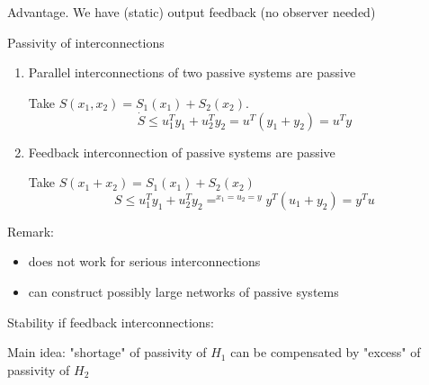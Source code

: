 Advantage. We have (static) output feedback (no observer needed)

Passivity of interconnections
\begin{enumerate}
\item Parallel interconnections of two passive systems are passive 

Take $S(x_1,x_2) = S_1(x_1) +S_2(x_2)$.
\begin{equation*}
\dot{S} \leq u_1^Ty_1 + u_2^Ty_2 = u^T(y_1+y_2) = u^Ty
\end{equation*}
\item Feedback interconnection of passive systems are passive


Take $S(x_1+x_2) = S_1(x_1) + S_2(x_2)$
\begin{equation*}
S \leq u_1^Ty_1 + u_2^Ty_2 =^{x_1=u_2=y} y^T(u_1+y_2) = y^Tu
\end{equation*}
\end{enumerate}

Remark:
\begin{itemize}
\item does not work for serious interconnections
\item can construct possibly large networks of passive systems
\end{itemize}

Stability if feedback interconnections:

Main idea: "shortage" of passivity of $H_1$ can be compensated by "excess" of passivity of $H_2$

